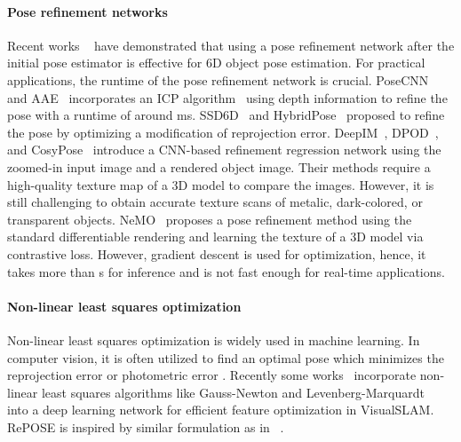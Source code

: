 \documentclass[10pt,twocolumn,letterpaper]{article}
\begin{document}
\paragraph{Pose refinement networks}
Recent works ~\cite{xiang2018posecnn,Sundermeyer_2018_ECCV,Zakharov_2019_ICCV,Song_2020_CVPR,li2018deepim} have demonstrated that using a pose refinement network after the initial pose estimator is effective for 6D object pose estimation. For practical applications, the runtime of the pose refinement network is crucial. PoseCNN~\cite{xiang2018posecnn} and AAE~\cite{Sundermeyer_2018_ECCV} incorporates an ICP algorithm~\cite{Zhang2014} using depth information to refine the pose with a runtime of around  ms. SSD6D~\cite{Kehl_2017_ICCV} and HybridPose~\cite{Song_2020_CVPR} proposed to refine the pose by optimizing a modification of reprojection error. DeepIM~\cite{li2018deepim}, DPOD~\cite{Zakharov_2019_ICCV}, and CosyPose~\cite{labbe2020} introduce a CNN-based refinement regression network using the zoomed-in input image and a rendered object image. Their methods require a high-quality texture map of a 3D model to compare the images. However, it is still challenging to obtain accurate texture scans of metalic, dark-colored, or transparent objects. NeMO~\cite{wang2021nemo} proposes a pose refinement method using the standard differentiable rendering and learning the texture of a 3D model via contrastive loss. However, gradient descent is used for optimization, hence, it takes more than s for inference and is not fast enough for real-time applications. 

\paragraph{Non-linear least squares optimization}
Non-linear least squares optimization is widely used in machine learning. In computer vision, it is often utilized to find an optimal pose which minimizes the reprojection error or photometric error \cite{Alismail-2016-5532,7219438,7780814}. Recently some works~\cite{Tang2019,gnnet,Clark_2018_ECCV} incorporate non-linear least squares algorithms like Gauss-Newton and Levenberg-Marquardt~\cite{10.1007/BFb0067700} into a deep learning network for efficient feature optimization in VisualSLAM\@. RePOSE is inspired by similar formulation as in ~\cite{Tang2019}.
\end{document}
